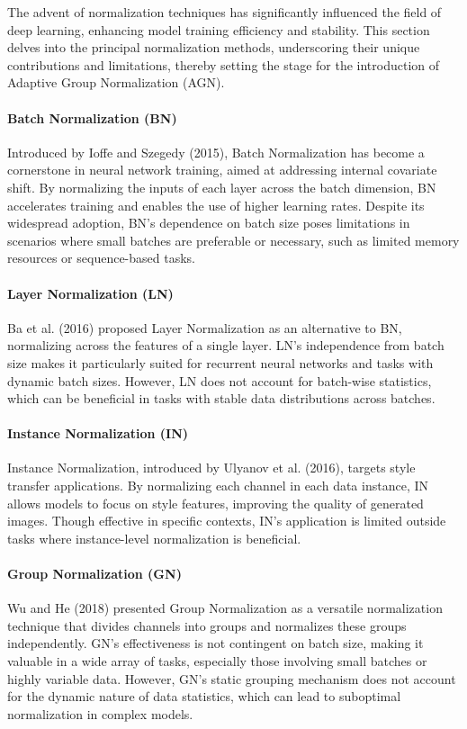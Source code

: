 The advent of normalization techniques has significantly influenced the field of deep learning, enhancing model training efficiency and stability. This section delves into the principal normalization methods, underscoring their unique contributions and limitations, thereby setting the stage for the introduction of Adaptive Group Normalization (AGN).

\paragraph{Batch Normalization (BN)}
Introduced by Ioffe and Szegedy (2015), Batch Normalization has become a cornerstone in neural network training, aimed at addressing internal covariate shift. By normalizing the inputs of each layer across the batch dimension, BN accelerates training and enables the use of higher learning rates. Despite its widespread adoption, BN's dependence on batch size poses limitations in scenarios where small batches are preferable or necessary, such as limited memory resources or sequence-based tasks.
\paragraph{Layer Normalization (LN)}
Ba et al. (2016) proposed Layer Normalization as an alternative to BN, normalizing across the features of a single layer. LN's independence from batch size makes it particularly suited for recurrent neural networks and tasks with dynamic batch sizes. However, LN does not account for batch-wise statistics, which can be beneficial in tasks with stable data distributions across batches.
\paragraph{Instance Normalization (IN)}
Instance Normalization, introduced by Ulyanov et al. (2016), targets style transfer applications. By normalizing each channel in each data instance, IN allows models to focus on style features, improving the quality of generated images. Though effective in specific contexts, IN's application is limited outside tasks where instance-level normalization is beneficial.
\paragraph{Group Normalization (GN)}
Wu and He (2018) presented Group Normalization as a versatile normalization technique that divides channels into groups and normalizes these groups independently. GN's effectiveness is not contingent on batch size, making it valuable in a wide array of tasks, especially those involving small batches or highly variable data. However, GN's static grouping mechanism does not account for the dynamic nature of data statistics, which can lead to suboptimal normalization in complex models.

